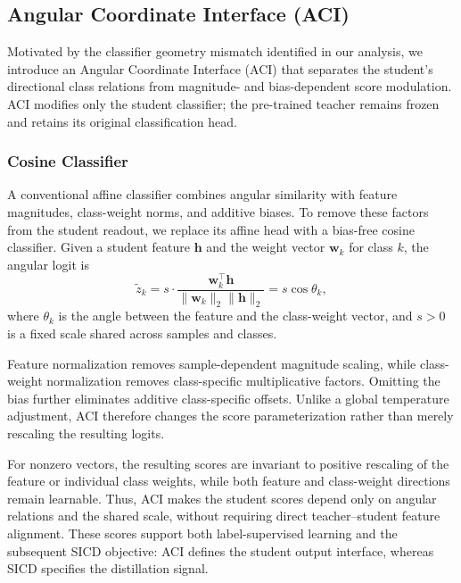 \subsection{Angular Coordinate Interface (ACI)}
\label{subsec:aci}
Motivated by the classifier geometry mismatch identified in our
analysis, we introduce an Angular Coordinate Interface (ACI) that
separates the student's directional class relations from
magnitude- and bias-dependent score modulation.
ACI modifies only the student classifier; the pre-trained teacher
remains frozen and retains its original classification head.

\subsubsection{Cosine Classifier}
A conventional affine classifier combines angular similarity
with feature magnitudes, class-weight norms, and additive biases.
To remove these factors from the student readout, we replace
its affine head with a bias-free cosine classifier.
Given a student feature $\mathbf{h}$ and the weight vector
$\mathbf{w}_k$ for class $k$, the angular logit is
\begin{equation}
    \tilde{z}_k
    = s \cdot
    \frac{\mathbf{w}_k^\top \mathbf{h}}
    {\|\mathbf{w}_k\|_2 \|\mathbf{h}\|_2}
    = s \cos\theta_k,
    \label{eq:aci_logit}
\end{equation}
where $\theta_k$ is the angle between the feature and the
class-weight vector, and $s>0$ is a fixed scale shared across
samples and classes.

Feature normalization removes sample-dependent magnitude
scaling, while class-weight normalization removes
class-specific multiplicative factors. Omitting the bias
further eliminates additive class-specific offsets.
Unlike a global temperature adjustment, ACI therefore changes
the score parameterization rather than merely rescaling
the resulting logits.

For nonzero vectors, the resulting scores are invariant to
positive rescaling of the feature or individual class weights,
while both feature and class-weight directions remain learnable.
Thus, ACI makes the student scores depend only on angular
relations and the shared scale, without requiring direct
teacher--student feature alignment.
These scores support both label-supervised learning and the
subsequent SICD objective: ACI defines the student output
interface, whereas SICD specifies the distillation signal.
